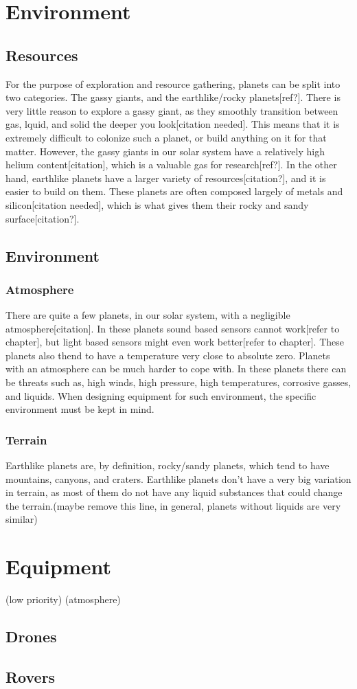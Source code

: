 \clearpage
\section{Environment}
\subsection{Resources}
For the purpose of exploration and resource gathering, planets can be split into two categories. The gassy giants, and the earthlike/rocky planets[ref?].
There is very little reason to explore a gassy giant, as they smoothly transition between gas, lquid, and solid the deeper you look[citation needed]. This means that it is extremely difficult to colonize such a planet, or build anything on it for that matter. However, the gassy giants in our solar system have a relatively high helium content[citation], which is a valuable gas for research[ref?]. 
In the other hand, earthlike planets have a larger variety of resources[citation?], and it is easier to build on them. These planets are often composed largely of metals and silicon[citation needed], which is what gives them their rocky and sandy surface[citation?].


\subsection{Environment}
\subsubsection{Atmosphere}
There are quite a few planets, in our solar system, with a negligible atmosphere[citation]. In these planets sound based sensors cannot work[refer to chapter], but light based sensors might even work better[refer to chapter]. These planets also thend to have a temperature very close to absolute zero. %
Planets with an atmosphere can be much harder to cope with. In these planets there can be threats such as, high winds, high pressure, high temperatures, corrosive gasses, and liquids. When designing equipment for such environment, the specific environment must be kept in mind.

\subsubsection{Terrain}
Earthlike planets are, by definition, rocky/sandy planets, which tend to have mountains, canyons, and craters.
Earthlike planets don't have a very big variation in terrain, as most of them do not have any liquid substances that could change the terrain.(maybe remove this line, in general, planets without liquids are very similar)


\section{Equipment}
(low priority) (atmosphere)
\subsection{Drones}
\subsection{Rovers}
